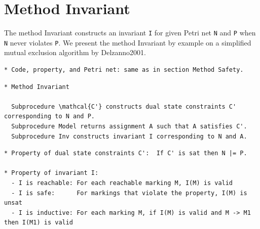 \documentclass{article}
\begin{document}
\iffalse

\newpage
\section{Method Invariant}

The method Invariant constructs an invariant \verb=I= for given Petri net \verb=N= and \verb=P= when \verb=N= never violates \verb=P=.
We present the method Invariant by example on a simplified mutual exclusion algorithm by Delzanno2001.

\begin{verbatim}
* Code, property, and Petri net: same as in section Method Safety.
\end{verbatim}

\begin{verbatim}
* Method Invariant

  Subprocedure \mathcal{C'} constructs dual state constraints C' corresponding to N and P.
  Subprocedure Model returns assignment A such that A satisfies C'.
  Subprocedure Inv constructs invariant I corresponding to N and A.
\end{verbatim}

\begin{center}
\end{center}

\begin{verbatim}
* Property of dual state constraints C':  If C' is sat then N |= P.

* Property of invariant I:
  - I is reachable: For each reachable marking M, I(M) is valid
  - I is safe:      For markings that violate the property, I(M) is unsat
  - I is inductive: For each marking M, if I(M) is valid and M -> M1 then I(M1) is valid
\end{verbatim}
\end{document}
